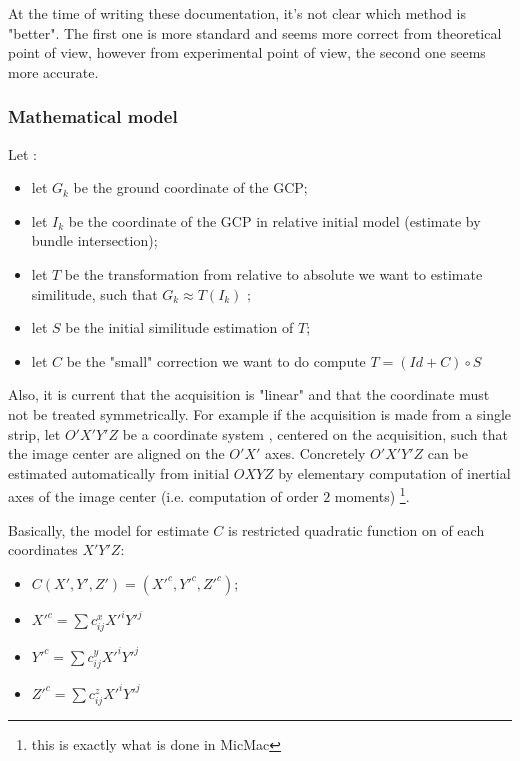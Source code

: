 At the time of writing these documentation, it's not clear which method is "better". The first one is more
standard and seems more correct from theoretical point of view, however from experimental point of view, the
second one seems more accurate.


\subsubsection{Mathematical model}

Let :

\begin{itemize}
   \item let $G_k$ be the ground coordinate of the GCP;
   \item let $I_k$ be the coordinate of the GCP in relative initial model (estimate by bundle intersection);
   \item let $T$ be the transformation from relative to absolute we want to estimate similitude, such that  $G_k \approx T(I_k)$ ;
   \item let $S$ be the initial similitude estimation of $T$;
   \item let $C$ be the "small" correction we want to do compute $T= (Id+C) \circ S$
\end{itemize}


Also, it is current that the acquisition is "linear" and that the coordinate must not be treated
symmetrically. For example if the acquisition is made from a single strip, let $O'X'Y'Z$ be a
coordinate system ,  centered on the acquisition, such that the image center are aligned on the $O'X'$ axes.
Concretely $O'X'Y'Z$ can be estimated automatically from initial $OXYZ$ by elementary computation of inertial axes of the
image center (i.e. computation of order $2$ moments) \footnote{this is exactly what is done in MicMac}.



Basically, the model for estimate $C$ is restricted  quadratic function on of  each coordinates $X'Y'Z$:

\begin{itemize}
   \item $C(X',Y',Z') = (X'^c,Y'^c,Z'^c)$;
   \item $X'^c = \sum c^x_{ij} X'^i Y'^j$
   \item $Y'^c = \sum c^y_{ij} X'^i Y'^j$
   \item $Z'^c = \sum c^z_{ij} X'^i Y'^j$
\end{itemize}


